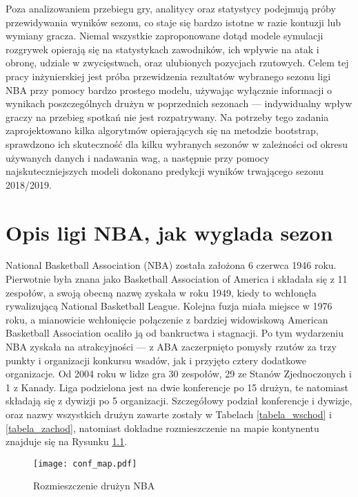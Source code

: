 \documentclass[inzynierska]{pwr_wmat_praca_dyplomowa}
\theoremstyle{plain}
\numberwithin{theorem}{chapter}
\theoremstyle{definition}
\numberwithin{theorem}{chapter}
\begin{document}
 Poza analizowaniem przebiegu gry, analitycy oraz statystycy podejmują próby przewidywania wyników sezonu, co staje się bardzo istotne w razie kontuzji lub wymiany gracza.\cite{replayNBA} \cite{graphicalNBA} Niemal wszystkie zaproponowane dotąd modele symulacji rozgrywek opierają się na statystykach zawodników, ich wpływie na atak i obronę, udziale w zwycięstwach, oraz ulubionych pozycjach rzutowych. Celem tej pracy inżynierskiej jest próba przewidzenia rezultatów wybranego sezonu ligi NBA przy pomocy bardzo prostego modelu, używając wyłącznie informacji o wynikach poszczególnych drużyn w poprzednich sezonach --- indywidualny wpływ graczy na przebieg spotkań nie jest rozpatrywany. Na potrzeby tego zadania zaprojektowano kilka algorytmów opierających się na metodzie bootstrap, sprawdzono ich skuteczność dla kilku wybranych sezonów w zależności od okresu używanych danych i nadawania wag, a następnie przy pomocy najskuteczniejszych modeli dokonano predykcji wyników trwającego sezonu 2018/2019. 



\chapter{Opis ligi NBA, jak wyglada sezon}\label{rodzial1}
National Basketball Association (NBA) została założona 6 czerwca 1946 roku. Pierwotnie była znana jako Basketball Association of America i składała się z 11 zespołów, a swoją obecną nazwę zyskała w roku 1949, kiedy to wchłonęła rywalizującą National Basketball League. Kolejna fuzja miała miejsce w 1976 roku, a mianowicie wchłonięcie połączenie z bardziej widowiskową American Basketball Association ocaliło ją od bankructwa i stagnacji. Po tym wydarzeniu NBA zyskała na atrakcyjności --- z ABA zaczerpnięto pomysły rzutów za trzy punkty i organizacji konkursu wsadów, jak i przyjęto cztery dodatkowe organizacje. \cite{history} Od 2004 roku w lidze gra 30 zespołów, 29 ze Stanów Zjednoczonych i 1 z Kanady. Liga podzielona jest na dwie konferencje po 15 drużyn, te natomiast składają się z dywizji po 5 organizacji. Szczegółowy podział konferencje i dywizje, oraz nazwy wszystkich drużyn zawarte zostały w Tabelach \ref{tabela_wschod} i \ref{tabela_zachod}, natomiast dokładne rozmieszczenie na mapie kontynentu znajduje się na Rysunku \ref{mapa_stany}.\cite{mapa}

\begin{figure}[t]
	\texttt{[image: conf\_map.pdf]}
	\caption{Rozmieszczenie drużyn NBA}\label{mapa_stany}
	\centering
\end{figure}
\end{document}
